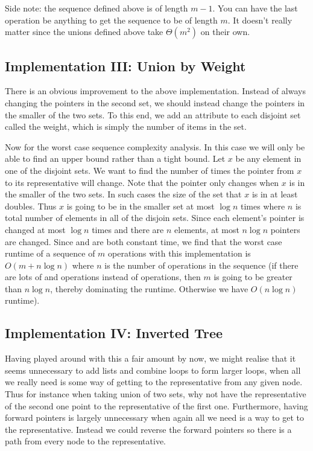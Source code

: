 Side note: the sequence defined above is of length $m - 1$. You can have the last operation be anything to get the sequence to be of length $m$. It doesn't really matter since the unions defined above take $\Theta(m^2)$ on their own.

\subsection{Implementation III: Union by Weight}
There is an obvious improvement to the above implementation. Instead of always changing the pointers in the second set, we should instead change the pointers in the smaller of the two sets. To this end, we add an attribute to each disjoint set called the weight, which is simply the number of items in the set.

Now for the worst case sequence complexity analysis. In this case we will only be able to find an upper bound rather than a tight bound. Let $x$ be any element in one of the disjoint sets. We want to find the number of times the pointer from $x$ to its representative will change. Note that the pointer only changes when $x$ is in the smaller of the two sets. In such cases the size of the set that $x$ is in at least doubles. Thus $x$ is going to be in the smaller set at most $\log n$ times where $n$ is total number of elements in all of the disjoin sets. Since each element's pointer is changed at most $\log n$ times and there are $n$ elements, at most $n \log n$ pointers are changed. Since  and  are both constant time, we find that the worst case runtime of a sequence of $m$ operations with this implementation is $O(m + n \log n)$ where $n$ is the number of  operations in the sequence (if there are lots of  and  operations instead of  operations, then $m$ is going to be greater than $n \log n$, thereby dominating the runtime. Otherwise we have $O(n \log n)$ runtime). 

\subsection{Implementation IV: Inverted Tree}
Having played around with this a fair amount by now, we might realise that it seems unnecessary to add lists and combine loops to form larger loops, when all we really need is some way of getting to the representative from any given node. Thus for instance when taking union of two sets, why not have the representative of the second one point to the representative of the first one. Furthermore, having forward pointers is largely unnecessary when again all we need is a way to get to the representative. Instead we could reverse the forward pointers so there is a path from every node to the representative.

